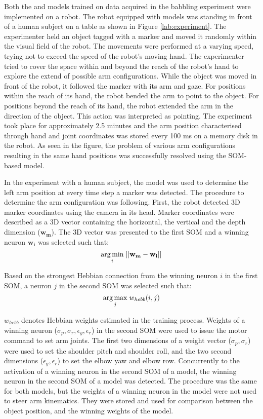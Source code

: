 Both the \bsom and \ssom models trained on data acquired in the babbling experiment were implemented on a robot. The robot equipped with models was standing in front of a human subject on a table as shown in Figure \ref{lab:experiment}. The experimenter held an object tagged with a marker and moved it randomly within the visual field of the robot. The movements were performed at a varying speed, trying not to exceed the speed of the robot's moving hand. The experimenter tried to cover the space within and beyond the reach of the robot's hand to explore the extend of possible arm configurations. While the object was moved in front of the robot, it followed the marker with its arm and gaze. For positions within the reach of its hand, the robot bended the arm to point to the object. For positions beyond the reach of its hand, the robot extended the arm in the direction of the object. This action was interpreted as pointing. The experiment took place for approximately 2.5 minutes and the arm position 
characterised through hand and joint coordinates was stored every 100 ms on a memory disk in the robot. As seen in the 
figure, the problem of various arm configurations resulting in the same hand positions was successfully resolved using the SOM-based model.

In the experiment with a human subject, the \bsom model was used to determine the left arm position at every time step a marker was detected. The procedure to determine the arm configuration was following. First, the robot detected 3D marker coordinates using the camera in its head. Marker coordinates were described as a 3D vector containing the horizontal, the vertical and the depth dimension ($\mathbf{w_m}$). 
The 3D vector was presented to the first SOM and a winning neuron $\mathbf{w_i}$ was selected such that: 
\begin{equation}
\underset{i}{\arg\min} \hspace{1mm} ||\mathbf{w_m}-\mathbf{w_i} ||
\end{equation}

Based on the strongest Hebbian connection from the winning neuron $i$ in the first SOM, a neuron $j$ in the second SOM was selected such that: 
\begin{equation}
\underset{j}{\arg\max} \hspace{1mm} w_{hebb}(i, j) 
\end{equation}

$w_{hebb}$ denotes Hebbian weights estimated in the training process.
Weights of a winning neuron ($\sigma_p, \sigma_r, \epsilon_y, \epsilon_r$) in the second SOM were used to issue the motor command to set arm joints. The first two dimensions of a weight vector ($\sigma_p, \sigma_r$) were used to set the shoulder pitch and shoulder roll, and the two second dimensions ($\epsilon_y, \epsilon_r$) to set the elbow yaw and elbow row. Concurrently to the activation of a winning neuron in the second SOM of a \bsom model, the winning neuron in the second SOM of a \ssom model was detected. The procedure was the same for both models, but the weights of a winning neuron in the \ssom model were not used to steer arm kinematics. They were stored and used for comparison between the object position, and the winning weights of the \bsom model.


